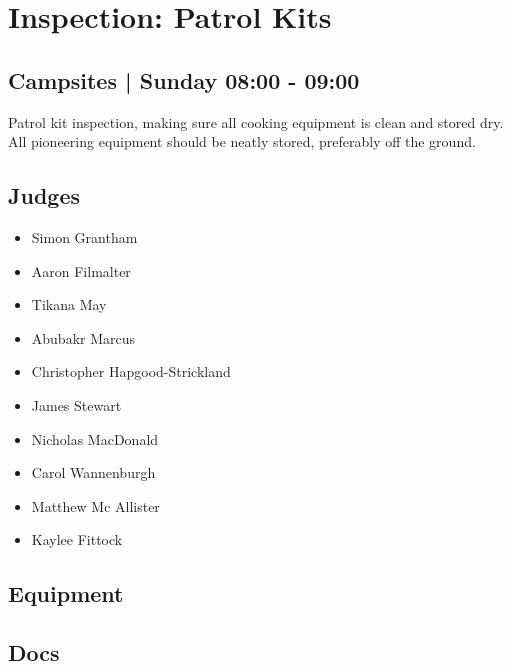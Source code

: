 \documentclass[10pt]{article}
\begin{document}
		\begin{minipage}{\linewidth}
		\setcounter{section}{28}
	\section{Inspection: Patrol Kits }
	\subsection*{Campsites | Sunday 08:00 - 09:00}

	Patrol kit inspection, making sure all cooking equipment is clean and stored dry. All pioneering equipment should be neatly stored, preferably off the ground.

	\begin{multicols}{2}
	\subsection*{\faUsers \: Judges}
	\begin{itemize}
			\item Simon Grantham
			\item Aaron Filmalter
			\item Tikana May
			\item Abubakr Marcus
			\item Christopher Hapgood-Strickland
			\item James Stewart
			\item Nicholas MacDonald
			\item Carol Wannenburgh
			\item Matthew Mc Allister
			\item Kaylee Fittock
		\end{itemize}
	\columnbreak
	\subsection*{\faWrench \: Equipment}
	        \vfill\null
        \subsection*{\faFile \: Docs}
     	\end{multicols}


	\vspace{1cm}
	\end{minipage}
\end{document}

